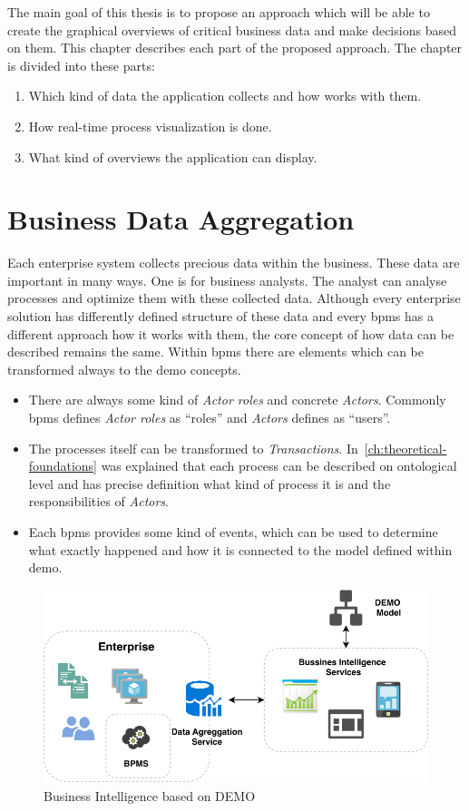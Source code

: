 The main goal of this thesis is to propose an approach which will be able to create the graphical overviews of critical business data and make decisions based on them. This chapter describes each part of the proposed approach. The chapter is divided into these parts:    
    \begin{enumerate}
      \item Which kind of data the application collects and how works with them.
      \item How real-time process visualization is done.
      \item What kind of overviews the application can display. 
    \end{enumerate}
\section{Business Data Aggregation}
Each enterprise system collects precious data within the business. These data are important in many ways. One is for business analysts. The analyst can analyse processes and optimize them with these collected data. Although every enterprise solution has differently defined structure of these data and every \gls{bpms} has a different approach how it works with them, the core concept of how data can be described remains the same. 
Within \gls{bpms} there are elements which can be transformed always to the \gls{demo} concepts.
\begin{itemize}
\item There are always some kind of \textit{Actor roles} and concrete \textit{Actors}. Commonly \gls{bpms} defines \textit{Actor roles} as ``roles'' and \textit{Actors} defines as ``users''.
\item The processes itself can be transformed to \textit{Transactions}. In~\cref{ch:theoretical-foundations} was explained that each process can be described on ontological level and has precise definition what kind of process it is and the responsibilities of \textit{Actors}.
\item Each \gls{bpms} provides some kind of events, which can be used to determine what exactly happened and how it is connected to the model defined within \gls{demo}.
\end{itemize}

\begin{figure}[ht!]
  \centering
  \includegraphics[width=12cm,keepaspectratio]{img/bi-demo-overview}
  \caption{Business Intelligence based on DEMO}
  \label{fig:bi-demo-overview}
\end{figure}    

